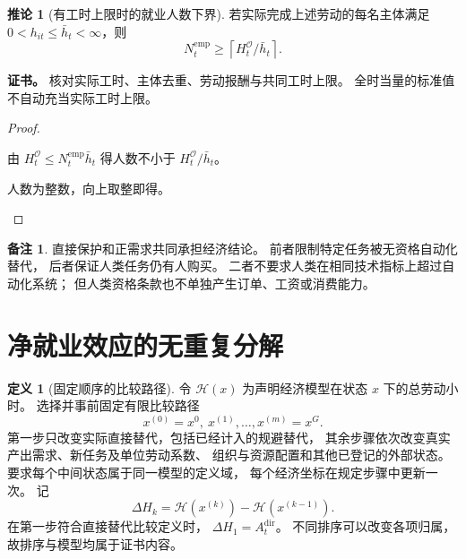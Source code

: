 \documentclass[UTF8,12pt,a4paper,openany,fontset=none,zihao=false]{ctexrep}
\theoremstyle{definition}
\newtheorem{definition}{定义}[chapter]
\newtheorem{corollary}{推论}[chapter]
\newtheorem{remark}{备注}[chapter]
\newenvironment{certificate}{\par\noindent\textbf{证书。}\ignorespaces}{\par}
\newcommand{\1}{\mathbf 1}
\begin{document}
\begin{corollary}[有工时上限时的就业人数下界]
\label{lab:cor-headcount}
若实际完成上述劳动的每名主体满足
\(0<h_{it}\le\bar h_t<\infty\)，则
\[
 N_t^{\mathrm{emp}}
 \ge
 \left\lceil H_t^{\mathcal O}/\bar h_t\right\rceil.
\]
\end{corollary}
\begin{certificate}
核对实际工时、主体去重、劳动报酬与共同工时上限。
全时当量的标准值不自动充当实际工时上限。
\end{certificate}
\begin{proof}
\begin{semanticsteps}
\item 由
\(H_t^{\mathcal O}\le N_t^{\mathrm{emp}}\bar h_t\)
得人数不小于 \(H_t^{\mathcal O}/\bar h_t\)。
\item 人数为整数，向上取整即得。
\end{semanticsteps}
\end{proof}

\begin{remark}
直接保护和正需求共同承担经济结论。
前者限制特定任务被无资格自动化替代，
后者保证人类任务仍有人购买。
二者不要求人类在相同技术指标上超过自动化系统；
但人类资格条款也不单独产生订单、工资或消费能力。
\end{remark}

\section{净就业效应的无重复分解}

\begin{definition}[固定顺序的比较路径]
\label{lab:def-decomposition}
令 \(\mathcal H(x)\) 为声明经济模型在状态 \(x\) 下的总劳动小时。
选择并事前固定有限比较路径
\[
 x^{(0)}=x^0,\ x^{(1)},\ldots,x^{(m)}=x^G.
\]
第一步只改变实际直接替代，包括已经计入的规避替代，
其余步骤依次改变真实产出需求、新任务及单位劳动系数、
组织与资源配置和其他已登记的外部状态。
要求每个中间状态属于同一模型的定义域，
每个经济坐标在规定步骤中更新一次。
记
\[
 \Delta H_k=\mathcal H(x^{(k)})-\mathcal H(x^{(k-1)}).
\]
在第一步符合直接替代比较定义时，
\(\Delta H_1=A_t^{\mathrm{dir}}\)。
不同排序可以改变各项归属，故排序与模型均属于证书内容。
\end{definition}
\end{document}
